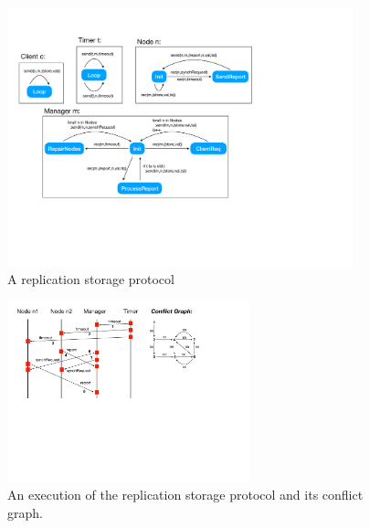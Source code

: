 \begin{figure}
\includegraphics[width=10cm]{replication.pdf}
\caption{A replication storage protocol}
\label{fig:replication}
\end{figure}

\begin{figure}
\includegraphics[width=7cm]{MSC-storage.pdf}
\caption{An execution of the replication storage protocol and its conflict graph.}
\label{fig:commit-exec}
\end{figure}

